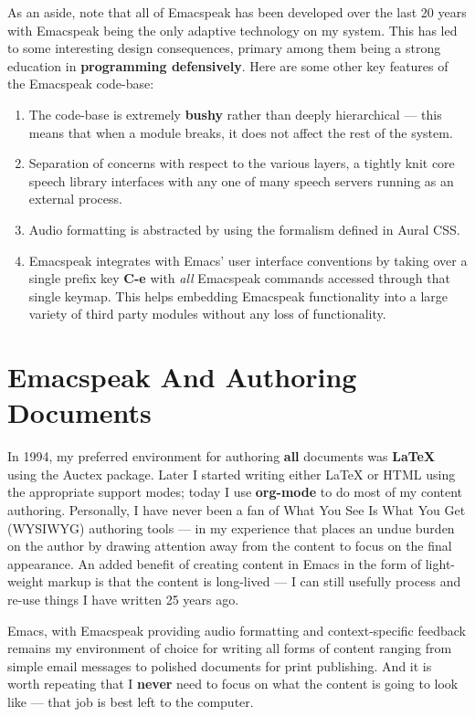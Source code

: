 \documentclass[11pt]{article}
\begin{document}
As an aside, note that all of Emacspeak has been developed over
the last 20 years with Emacspeak being the only adaptive
technology on my system. This has led to  some interesting design
consequences, primary among them being  a strong education in
\textbf{programming defensively}.  Here are some other key features of
the Emacspeak code-base:

\begin{enumerate}
\item The code-base is extremely \textbf{bushy} rather than deeply
hierarchical — this means that when a module breaks, it does
not affect the rest of the system.
\item Separation of concerns with respect to the various layers, a
tightly knit  core speech library  interfaces  with  any one
of many  speech servers  running as an external process.
\item Audio formatting is abstracted by using the formalism
defined in Aural CSS.
\item Emacspeak integrates with Emacs' user interface conventions
by taking over a single prefix key \textbf{C-e} with \emph{all}
Emacspeak commands accessed through that single keymap.
This helps embedding Emacspeak functionality into a large
variety of third party modules without any loss of functionality.
\end{enumerate}


\section{Emacspeak And Authoring Documents}
\label{sec-6}

In 1994, my preferred environment for authoring \textbf{all} documents
was \textbf{\LaTeX{}} using the Auctex package. Later I started writing
either \LaTeX{} or HTML using the appropriate support modes; today I
use \textbf{org-mode} to do most of my content authoring. Personally, I
have never been a fan of What You See Is What You Get (WYSIWYG)
authoring tools — in my experience that places an undue burden on
the author by drawing attention away from the content to focus on
the final appearance. An added benefit of creating content in
Emacs in the form of light-weight markup is that the content is
long-lived — I can still usefully process and re-use things I
have written 25 years ago.

Emacs, with Emacspeak providing audio formatting and
context-specific feedback remains my environment of choice for
writing all forms of content ranging from simple email messages
to polished documents for print publishing. And it is worth
repeating that I \textbf{never} need to focus on what the content is
going to look like — that job is best left to the computer.
\end{document}
